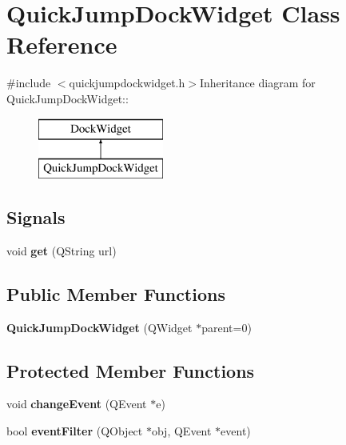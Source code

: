 \hypertarget{classQuickJumpDockWidget}{
\section{QuickJumpDockWidget Class Reference}
\label{classQuickJumpDockWidget}
}


{\ttfamily \#include $<$quickjumpdockwidget.h$>$}Inheritance diagram for QuickJumpDockWidget::\begin{figure}[H]
\begin{center}
\leavevmode
\includegraphics[height=2cm]{classQuickJumpDockWidget}
\end{center}
\end{figure}
\subsection*{Signals}
\begin{DoxyCompactItemize}
\item 
\hypertarget{classQuickJumpDockWidget_a770ffde4892f3c10d8c3de3f4aa252ae}{
void {\bfseries get} (QString url)}
\label{classQuickJumpDockWidget_a770ffde4892f3c10d8c3de3f4aa252ae}

\end{DoxyCompactItemize}
\subsection*{Public Member Functions}
\begin{DoxyCompactItemize}
\item 
\hypertarget{classQuickJumpDockWidget_ac079931f37c726d0a70801ca3b1d8bf7}{
{\bfseries QuickJumpDockWidget} (QWidget $\ast$parent=0)}
\label{classQuickJumpDockWidget_ac079931f37c726d0a70801ca3b1d8bf7}

\end{DoxyCompactItemize}
\subsection*{Protected Member Functions}
\begin{DoxyCompactItemize}
\item 
\hypertarget{classQuickJumpDockWidget_abba1b097edbb75d5fbf798036d68aeaa}{
void {\bfseries changeEvent} (QEvent $\ast$e)}
\label{classQuickJumpDockWidget_abba1b097edbb75d5fbf798036d68aeaa}

\item 
\hypertarget{classQuickJumpDockWidget_af688adab679a602d59b5f53af0551d9e}{
bool {\bfseries eventFilter} (QObject $\ast$obj, QEvent $\ast$event)}
\label{classQuickJumpDockWidget_af688adab679a602d59b5f53af0551d9e}

\end{DoxyCompactItemize}


